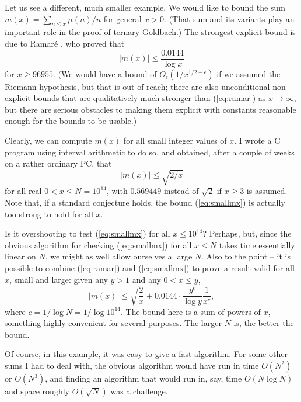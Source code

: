   Let us see a different, much smaller example. We would like to bound
  the sum $m(x) =\sum_{n\leq x} \mu(n)/n$ for general $x>0$. (That sum and its
  variants play an important role in the proof of ternary Goldbach.)
  The strongest
  explicit bound is due to Ramar\'e \cite{ramare2015explicit}, who proved that
  \begin{equation}\label{eq:ramar}
    |m(x)|\leq \frac{0.0144}{\log x}\end{equation}
  for $x\geq 96955$. (We would have a bound of $O_\epsilon(1/x^{1/2-\epsilon})$ if
  we assumed the Riemann hypothesis, but that is out of reach; there
  are also unconditional non-explicit bounds that are qualitatively
  much stronger than (\ref{eq:ramar}) as $x\to \infty$, but there are
  serious obstacles to making them explicit with constants reasonable enough
  for the bounds to be usable.)

  Clearly, we can compute $m(x)$ for all small integer values of $x$.
  I wrote a C program using interval arithmetic to do so, and obtained, after
  a couple of weeks on a rather ordinary PC, that
  \begin{equation}\label{eq:smallmx}
    |m(x)|\leq \sqrt{2/x}
  \end{equation}
  for all real $0<x\leq N = 10^{14}$, with $0.569449$ instead of $\sqrt{2}$ if
  $x\geq 3$ is assumed. Note that, if a standard conjecture holds, the bound
  (\ref{eq:smallmx}) is actually too strong to hold for all $x$.

  Is it overshooting to test (\ref{eq:smallmx}) for all $x\leq 10^{14}$? Perhaps, but, since the
  obvious algorithm for checking (\ref{eq:smallmx}) for all $x\leq N$ takes
  time essentially linear on $N$, we might as well allow ourselves a large $N$.
  Also to the point -- it is possible to combine (\ref{eq:ramar}) and
  (\ref{eq:smallmx}) to prove a result valid for all $x$, small and large:
  given any $y>1$ and any $0<x\leq y$,
 \[|m(x)|\leq \sqrt{\frac{2}{x}} + 0.0144\cdot \frac{y^c}{\log y} \frac{1}{x^c},\]
  where $c=1/\log N= 1/\log 10^{14}$.
  The bound here is a sum of powers of $x$, something highly convenient for
  several purposes. The larger $N$ is, the better the bound.
  
  
  Of course, in this example, it was easy to give a fast algorithm. For
  some other sums I had to deal with, the obvious algorithm would have run in
  time $O(N^2)$ or $O(N^3)$, and finding an algorithm that would run in,
  say, time $O(N \log N)$ and space roughly $O(\sqrt{N})$ was a challenge.
  
